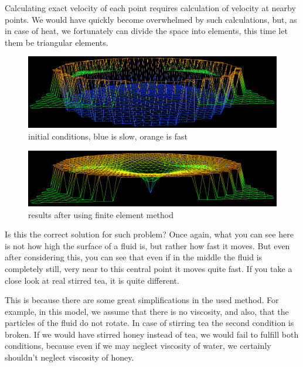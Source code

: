 \documentclass[a4paper,12pt]{article}
\begin{document}
Calculating exact velocity of each point requires calculation of velocity at nearby points. We would have quickly become
overwhelmed by such calculations, but, as in case of heat, we fortunately can divide the space into elements, this time
let them be triangular elements.

\begin{figure}[H]
\begin{center}
  \includegraphics[width=\textwidth]{flow_before}
\end{center}
\caption{initial conditions, blue is slow, orange is fast}
\end{figure}

\begin{figure}[H]
\begin{center}
  \includegraphics[width=\textwidth]{flow_after}
\end{center}
\caption{results after using finite element method}
\end{figure}

Is this the correct solution for such problem? Once again, what you can see here is not how high the surface of a fluid
is, but rather how fast it moves. But even after considering this, you can see that even if in the middle the fluid is
completely still, very near to this central point it moves quite fast. If you take a close look at real stirred tea, it
is quite different.


This is because there are some great simplifications in the used method. For example, in this model, we assume that
there is no viscosity, and also, that the particles of the fluid do not rotate. In case of stirring tea the second
condition is broken. If we would have stirred honey instead of tea, we would fail to fulfill both conditions, because
even if we may neglect viscosity of water, we certainly shouldn't neglect viscosity of honey.
\end{document}
